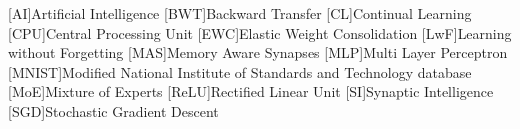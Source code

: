 \begin{acronym}[PermutedMNIST]
  [AI]{Artificial Intelligence}
  [BWT]{Backward Transfer}
  [CL]{Continual Learning}
  [CPU]{Central Processing Unit}
  [EWC]{Elastic Weight Consolidation}
  [LwF]{Learning without Forgetting}
  [MAS]{Memory Aware Synapses}
  [MLP]{Multi Layer Perceptron}
  [MNIST]{Modified National Institute of Standards and Technology database}
  [MoE]{Mixture of Experts}
  [ReLU]{Rectified Linear Unit}
  [SI]{Synaptic Intelligence}
  [SGD]{Stochastic Gradient Descent}
\end{acronym}
